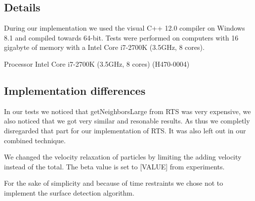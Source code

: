 \documentclass[../../main.tex]{subfiles}
\begin{document}

\subsection{Details}
During our implementation we used the visual C++ 12.0 compiler on Windows 8.1 and compiled towards 64-bit. Tests were performed on computers with 16 gigabyte of memory with a Intel Core i7-2700K (3.5GHz, 8 cores).

Processor Intel Core i7-2700K (3.5GHz, 8 cores) (H470-0004)

\subsection{Implementation differences}
In our tests we noticed that getNeighborsLarge from RTS was very expensive, we also noticed that we got very similar and resonable results. As thus we completly disregarded that part for our implementation of RTS. It was also left out in our combined technique. %


We changed the velocity relaxation of particles by limiting the adding velocity instead of the total. The beta value is set to [VALUE] from experiments. 

For the sake of simplicity and because of time restraints we chose not to implement the surface detection algorithm.
\end{document}
